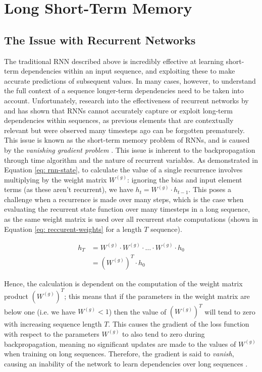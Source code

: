 \documentclass[a4paper, 11pt]{report}
\begin{document}
    \section{Long Short-Term Memory}

    \subsection{The Issue with Recurrent Networks}

    The traditional RNN described above is incredibly effective at learning short-term dependencies within an input sequence, and exploiting these to make accurate predictions of subsequent values. In many cases, however, to understand the full context of a sequence longer-term dependencies need to be taken into account. Unfortunately, research into the effectiveness of recurrent networks by \citet{hochreiter-1991} and \citet{bengio-1994} has shown that RNNs cannot accurately capture or exploit long-term dependencies within sequences, as previous elements that are contextually relevant but were observed many timesteps ago can be forgotten prematurely. This issue is known as the short-term memory problem of RNNs, and is caused by the \emph{vanishing gradient problem} \citep{hochreiter-1991}. This issue is inherent to the backpropagation through time algorithm and the nature of recurrent variables. As demonstrated in Equation \ref{eq: rnn-state}, to calculate the value of a single recurrence involves multiplying by the weight matrix $W^{(g)}$: ignoring the bias and input element terms (as these aren't recurrent), we have $h_t = W^{(g)} \cdot h_{t-1}$. This poses a challenge when a recurrence is made over many steps, which is the case when evaluating the recurrent state function over many timesteps in a long sequence, as the same weight matrix is used over all recurrent state computations (shown in Equation \ref{eq: reccurent-weights} for a length $T$ sequence).

    \begin{align}
        \label{eq: reccurent-weights}
        h_T &= W^{(g)} \cdot W^{(g)} \cdot \ldots \cdot W^{(g)} \cdot h_0 \\
        &= (W^{(g)})^T \cdot h_0
    \end{align}

    Hence, the calculation is dependent on the computation of the weight matrix product $(W^{(g)})^T$; this means that if the parameters in the weight matrix are below one (i.e. we have $W^{(g)} < 1$) then the value of $(W^{(g)})^T$ will tend to zero with increasing sequence length $T$. This causes the gradient of the loss function with respect to the parameters $W^{(g)}$ to also tend to zero during backpropagation, meaning no significant updates are made to the values of $W^{(g)}$ when training on long sequences. Therefore, the gradient is said to \emph{vanish}, causing an inability of the network to learn dependencies over long sequences \citep{bengio-1994}.
\end{document}
